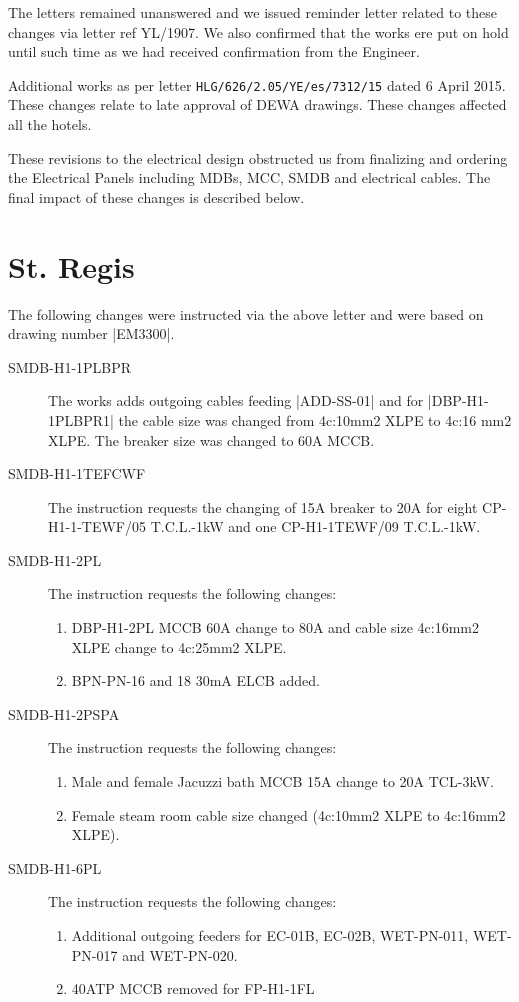 The letters remained unanswered and we issued reminder letter related to these changes via letter ref YL/1907. We also confirmed that the works ere put on hold until such time as we had received confirmation from the Engineer.

Additional works as per letter \texttt{HLG/626/2.05/YE/es/7312/15} dated 6 April 2015. These changes relate to late approval of DEWA drawings. These changes affected all the hotels.

These revisions to the electrical design obstructed us from finalizing and ordering the Electrical Panels including MDBs, MCC, SMDB and electrical cables. The final impact of these changes is described below.

\section{St. Regis}
The following changes were instructed via the above letter and were based on drawing number |EM3300|.
\begin{description}
\item[SMDB-H1-1PLBPR] The works adds outgoing cables feeding |ADD-SS-01| and for |DBP-H1-1PLBPR1|  the cable size was changed from 4c:10mm2 XLPE to 4c:16 mm2 XLPE. The breaker size was changed to 60A MCCB.

\item[SMDB-H1-1TEFCWF] The instruction requests the changing of 15A breaker to 20A for eight CP-H1-1-TEWF/05 T.C.L.-1kW and one CP-H1-1TEWF/09 T.C.L.-1kW.

\item[SMDB-H1-2PL] The instruction requests the following changes:
   \begin{enumerate}
      \item DBP-H1-2PL MCCB 60A change to 80A and cable size 4c:16mm2 XLPE change to 4c:25mm2 XLPE.
      \item BPN-PN-16 and 18 30mA ELCB added.
   \end{enumerate}

\item[SMDB-H1-2PSPA] The instruction requests the following changes:
    \begin{enumerate}
      \item Male and female Jacuzzi bath MCCB 15A change to 20A TCL-3kW.
      \item Female steam room cable size changed (4c:10mm2 XLPE to 4c:16mm2 XLPE).
    \end{enumerate}


\item[SMDB-H1-6PL] The instruction requests the following changes:
   \begin{enumerate}
      \item Additional outgoing feeders for EC-01B, EC-02B, WET-PN-011, WET-PN-017 and WET-PN-020.
      \item 40ATP MCCB removed for FP-H1-1FL
   \end{enumerate}

\end{description}

